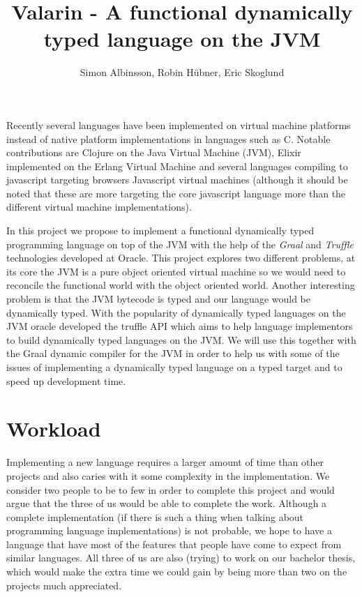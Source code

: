 \documentclass[a4paper,11pt]{article}
\title{Valarin - A functional dynamically typed language on the JVM}
\author{Simon Albinsson, Robin Hübner, Eric Skoglund}
\begin{document}
\maketitle
Recently several languages have been implemented on virtual machine platforms instead of native platform implementations in languages such as C. Notable contributions are Clojure on the Java Virtual Machine (JVM), Elixir implemented on the Erlang Virtual Machine and several languages compiling to javascript targeting browsers Javascript virtual machines (although it should be noted that these are more targeting the core javascript language more than the different virtual machine implementations).

In this project we propose to implement a functional dynamically typed programming language on top of the JVM with the help of the \emph{Graal} and \emph{Truffle} technologies developed at Oracle. This project explores two different problems, at its core the JVM is a pure object oriented virtual machine so we would need to reconcile the functional world with the object oriented world. Another interesting problem is that the JVM bytecode is typed and our language would be dynamically typed. With the popularity of dynamically typed languages on the JVM oracle developed the truffle API which aims to help language implementors to build dynamically typed languages on the JVM. We will use this together with the Graal dynamic compiler for the JVM in order to help us with some of the issues of implementing a dynamically typed language on a typed target and to speed up development time.

\section{Workload}
Implementing a new language requires a larger amount of time than other projects and also caries with it some complexity in the implementation. We consider two people to be to few in order to complete this project and would argue that the three of us would be able to complete the work. Although a complete implementation (if there is such a thing when talking about programming language implementations) is not probable, we hope to have a language that have most of the features that people have come to expect from similar languages. All three of us are also (trying) to work on our bachelor thesis, which would make the extra time we could gain by being more than two on the projects much appreciated.
\end{document}
